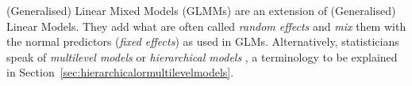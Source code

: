 \documentclass[a4paper,12pt]{article}
\newcommand{\ie}{i.\,e.,\ }
\begin{document}
(Generalised) Linear Mixed Models (GLMMs) are an extension of (Generalised) Linear Models.
They add what are often called \textit{random effects} and \textit{mix} them with the normal predictors (\textit{fixed effects}) as used in GLMs.
Alternatively, statisticians speak of \textit{multilevel models} or \textit{hierarchical models} \citep{GelmanHill2006}, a terminology to be explained in Section~\ref{sec:hierarchicalormultilevelmodels}.
\end{document}
